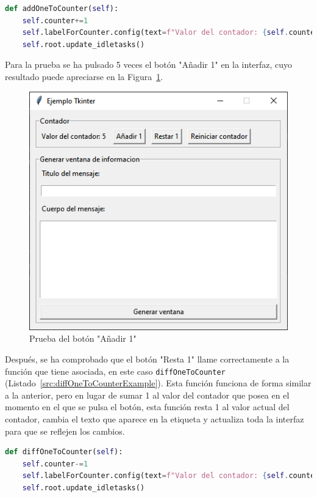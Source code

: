\begin{lstlisting}[language=Python,
                   style=python,
                   frame=none,
                   numbers=none,
                   basicstyle=\ttfamily\normalsize,
                   caption={Función \texttt{addOneToCounter} del ejemplo de Tkinter},
                   label=src:addOneToCounterExample,
                   inputencoding=utf8]                   
def addOneToCounter(self):
    self.counter+=1
    self.labelForCounter.config(text=f"Valor del contador: {self.counter}")
    self.root.update_idletasks()
\end{lstlisting}

Para la prueba se ha pulsado 5 veces el botón "Añadir 1" en la interfaz, cuyo resultado puede apreciarse en la Figura~\ref{fig:counterFiveExample}.

\begin{figure}[H]
    \centering
    \includegraphics[width=0.6\linewidth]{fig/Ejemplo Tkinter/contador 5.png}
    \caption{Prueba del botón "Añadir 1"}
    \label{fig:counterFiveExample}
\end{figure}

Después, se ha comprobado que el botón "Resta 1" llame correctamente a la función que tiene asociada, en este caso \texttt{diffOneToCounter} (Listado~\ref{src:diffOneToCounterExample}). Esta función funciona de forma similar a la anterior, pero en lugar de sumar 1 al valor del contador que posea en el momento en el que se pulsa el botón, esta función resta 1 al valor actual del contador, cambia el texto que aparece en la etiqueta y actualiza toda la interfaz para que se reflejen los cambios.

\begin{lstlisting}[language=Python,
                   style=python,
                   frame=none,
                   numbers=none,
                   basicstyle=\ttfamily\normalsize,
                   caption={Función \texttt{diffOneToCounter} del ejemplo de Tkinter},
                   label=src:diffOneToCounterExample,
                   inputencoding=utf8]                   
def diffOneToCounter(self):
    self.counter-=1
    self.labelForCounter.config(text=f"Valor del contador: {self.counter}")
    self.root.update_idletasks()
\end{lstlisting}

